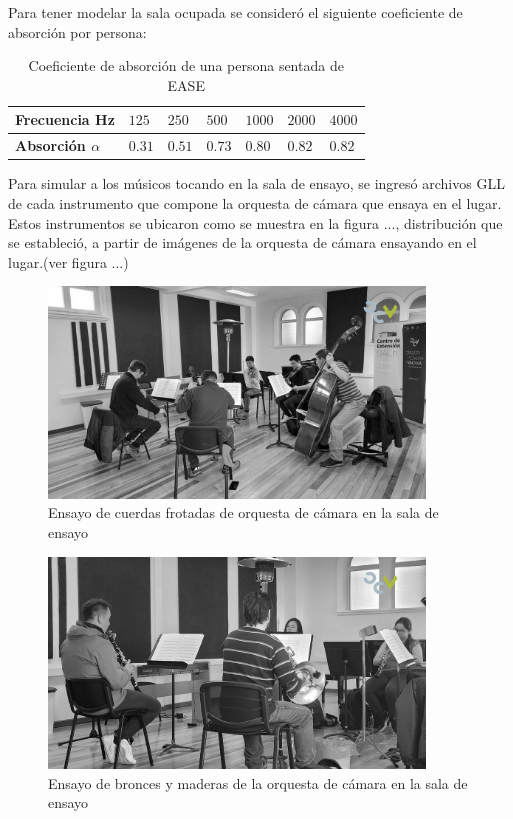 \noindent Para tener modelar la sala ocupada se consideró el siguiente coeficiente de absorción por persona:
\begin{table}[H]
    \centering
    \caption{Coeficiente de absorción de una persona sentada de EASE}
    \label{tab: coef abs persona}
    \begin{tabular}{|l|l|l|l|l|l|l|}
    \hline
    \textbf{Frecuencia Hz}      & $125$  & $250$  & $500$  & $1000$ & $2000$ & $4000$ \\ \hline
    \textbf{Absorción $\alpha$} & $0.31$ & $0.51$ & $0.73$ & $0.80$ & $0.82$ & $0.82$ \\ \hline
    \end{tabular}
\end{table}

\noindent Para simular a los músicos tocando en la sala de ensayo, se ingresó archivos GLL de
cada instrumento que compone la orquesta de cámara que ensaya en el lugar.
Estos instrumentos se ubicaron como se muestra en la figura ..., distribución que se estableció,
a partir de imágenes de la orquesta de cámara ensayando en el lugar.(ver figura ...)
\begin{figure}[H]
    \centering
    \includegraphics[width=10cm]{Imagenes/OCV/OCV cuerdas.jpg}
    \caption{Ensayo de cuerdas frotadas de orquesta de cámara en la sala de ensayo}
\end{figure}

\begin{figure}[H]
    \centering
    \includegraphics[width=10cm]{Imagenes/OCV/OCV vientos.jpg}
    \caption{Ensayo de bronces y maderas de la orquesta de cámara en la sala de ensayo}
\end{figure}